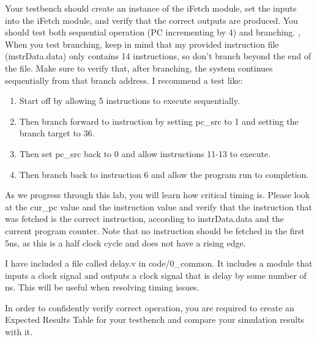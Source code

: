 Your testbench should create an instance of the iFetch module, set the inputs into the iFetch module, and verify that the correct outputs are produced. You should test both sequential operation (PC incrementing by 4) and branching.  ,   When you test branching, keep in mind that my provided instruction file (instrData.data) only contains 14 instructions, so don't branch beyond the end of the file.  Make sure to verify that, after branching, the system continues sequentially from that branch address.  I recommend a test like:
\begin{enumerate}
	\item Start off by allowing 5 instructions to execute sequentially.
	\item Then branch forward to instruction by setting pc\_src to 1 and setting the branch target to 36.
	\item Then set pc\_src back to 0 and allow instructions 11-13 to execute.
	\item Then branch back to instruction 6 and allow the program run to completion.
\end{enumerate}

As we progress through this lab, you will learn how critical timing is.  Please look at the cur\_pc value and the instruction value and verify that the instruction that was fetched is the correct instruction, according to instrData.data and the current program counter.  Note that no instruction should be fetched in the first 5ns, as this is a half clock cycle and does not have a rising edge.  

I have included a file called delay.v in code/0\_common.  It includes a module that inputs a clock signal and outputs a clock signal that is delay by some number of ns.  This will be useful when resolving timing issues.  

In order to confidently verify correct operation, you are required to create an Expected Results Table for your testbench and compare your simulation results with it.


